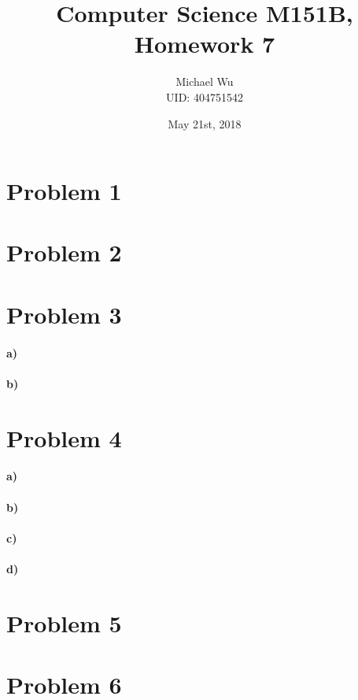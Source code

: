 \documentclass[12pt]{article}
\begin{document}
\title{Computer Science M151B, Homework 7}
\date{May 21st, 2018}
\author{Michael Wu\\UID: 404751542}
\maketitle

\section*{Problem 1}

\section*{Problem 2}

\section*{Problem 3}

\paragraph{a)}

\paragraph{b)}

\section*{Problem 4}

\paragraph{a)}

\paragraph{b)}

\paragraph{c)}

\paragraph{d)}

\section*{Problem 5}

\section*{Problem 6}
\end{document}
